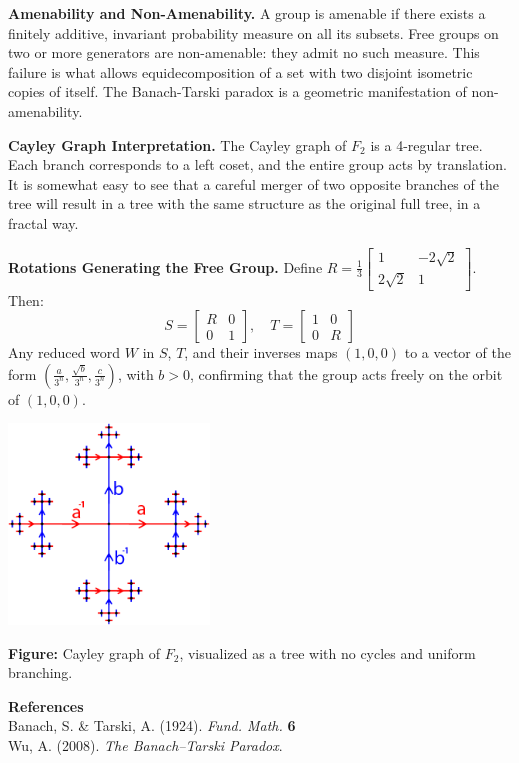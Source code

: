 \begin{technical}
    \columnbreak

    \textbf{Amenability and Non-Amenability.}  
    A group is amenable if there exists a finitely additive, invariant probability measure on all its subsets. Free groups on two or more generators are non-amenable: they admit no such measure. This failure is what allows equidecomposition of a set with two disjoint isometric copies of itself. The Banach-Tarski paradox is a geometric manifestation of non-amenability.

    \textbf{Cayley Graph Interpretation.}  
    The Cayley graph of \(F_2\) is a 4-regular tree. Each branch corresponds to a left coset, and the entire group acts by translation. It is somewhat easy to see that a careful merger of two opposite branches of the tree will result in a tree with the same structure as the original full tree, in a fractal way.

    \textbf{Rotations Generating the Free Group.}  
    Define $R = \frac{1}{3}\begin{bmatrix} 1 & -2\sqrt{2} \\ 2\sqrt{2} & 1 \end{bmatrix}$. Then:
    \[
    S = \begin{bmatrix} R & 0 \\ 0 & 1 \end{bmatrix}, \quad
    T = \begin{bmatrix} 1 & 0 \\ 0 & R \end{bmatrix}
    \]
    Any reduced word \(W\) in \(S\), \(T\), and their inverses maps \((1,0,0)\) to a vector of the form \(\left( \frac{a}{3^n}, \frac{\sqrt{b}}{3^n}, \frac{c}{3^n} \right)\), with \(b > 0\), confirming that the group acts freely on the orbit of \((1,0,0)\).

    \begin{center}
    \includegraphics[width=0.4\textwidth]{01_BanachTarskiParadox/F2_Cayley_Graph_tp1.png}

    \vspace{0.5em}
    \small
    \textbf{Figure:} Cayley graph of \(F_2\), visualized as a tree with no cycles and uniform branching.
    \end{center}

    \vspace{0.5em}
    \noindent\textbf{References} \\
    Banach, S. \& Tarski, A. (1924). \textit{Fund. Math.} \textbf{6}\\
    Wu, A. (2008). \textit{The Banach--Tarski Paradox}.
\end{technical}